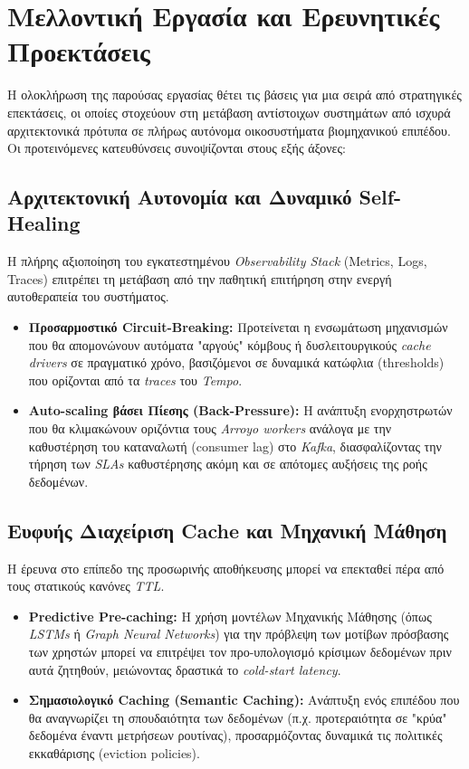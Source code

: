 \section{Μελλοντική Εργασία και Ερευνητικές Προεκτάσεις}

Η ολοκλήρωση της παρούσας εργασίας θέτει τις βάσεις για μια σειρά από
στρατηγικές επεκτάσεις, οι οποίες στοχεύουν στη μετάβαση αντίστοιχων συστημάτων
από ισχυρά αρχιτεκτονικά πρότυπα σε πλήρως αυτόνομα οικοσυστήματα βιομηχανικού
επιπέδου. Οι προτεινόμενες κατευθύνσεις συνοψίζονται στους εξής άξονες:

\subsection{Αρχιτεκτονική Αυτονομία και Δυναμικό Self-Healing}

Η πλήρης αξιοποίηση του εγκατεστημένου \textit{Observability Stack} (Metrics,
Logs, Traces) επιτρέπει τη μετάβαση από την παθητική επιτήρηση στην ενεργή
αυτοθεραπεία του συστήματος.

\begin{itemize}
	\item \textbf{Προσαρμοστικό Circuit-Breaking:} Προτείνεται η
	      ενσωμάτωση μηχανισμών που θα απομονώνουν αυτόματα "αργούς"
	      κόμβους ή δυσλειτουργικούς \textit{cache drivers} σε πραγματικό
	      χρόνο, βασιζόμενοι σε δυναμικά κατώφλια (thresholds) που
	      ορίζονται από τα \textit{traces} του \textit{Tempo}.
	\item \textbf{Auto-scaling βάσει Πίεσης (Back-Pressure):} Η ανάπτυξη
	      ενορχηστρωτών που θα κλιμακώνουν οριζόντια τους \textit{Arroyo
		      workers} ανάλογα με την καθυστέρηση του καταναλωτή (consumer
	      lag) στο \textit{Kafka}, διασφαλίζοντας την τήρηση των
	      \textit{SLAs} καθυστέρησης ακόμη και σε απότομες αυξήσεις της
	      ροής δεδομένων.
\end{itemize}

\subsection{Ευφυής Διαχείριση Cache και Μηχανική Μάθηση}

Η έρευνα στο επίπεδο της προσωρινής αποθήκευσης μπορεί να επεκταθεί πέρα από
τους στατικούς κανόνες \textit{TTL}.

\begin{itemize}
	\item \textbf{Predictive Pre-caching:} Η χρήση μοντέλων Μηχανικής
	      Μάθησης (όπως \textit{LSTMs} ή \textit{Graph Neural Networks})
	      για την πρόβλεψη των μοτίβων πρόσβασης των χρηστών μπορεί να
	      επιτρέψει τον προ-υπολογισμό κρίσιμων δεδομένων πριν αυτά
	      ζητηθούν, μειώνοντας δραστικά το \textit{cold-start latency}.
	\item \textbf{Σημασιολογικό Caching (Semantic Caching):} Ανάπτυξη ενός
	      επιπέδου που θα αναγνωρίζει τη σπουδαιότητα των δεδομένων (π.χ.
	      προτεραιότητα σε "κρύα" δεδομένα έναντι μετρήσεων ρουτίνας),
	      προσαρμόζοντας δυναμικά τις πολιτικές εκκαθάρισης (eviction
	      policies).
\end{itemize}

